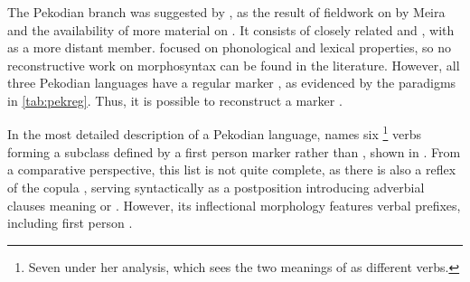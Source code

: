 \subsubsection{\PPek {}}
\label{sec:pekodian}
The Pekodian branch was suggested by \textcite{meira2005southern}, as the result of fieldwork on \bakairi by Meira and the availability of more material on \ikpeng. %
It consists of closely related \arara and \ikpeng, with \bakairi as a more distant member.
\textcite{meira2005southern} focused on phonological and lexical properties, so no reconstructive work on \PPek morphosyntax can be found in the literature.
However, all three Pekodian languages have a regular  marker , as evidenced by the paradigms in \cref{tab:pekreg}.
Thus, it is possible to reconstruct a \PPek {} marker .




In the most detailed description of a Pekodian language, \textcite{alves2017arara} names six%
\footnote{Seven under her analysis, which sees the two meanings of   as different verbs.}
\arara {} verbs forming a subclass defined by a first person marker  rather than , shown in .
From a comparative perspective, this list is not quite complete, as there is also a reflex of the copula , serving syntactically as a postposition introducing adverbial clauses meaning  or  \parencite[199--201]{alves2017arara}.
However, its inflectional morphology features verbal \setone prefixes, including first person  .

